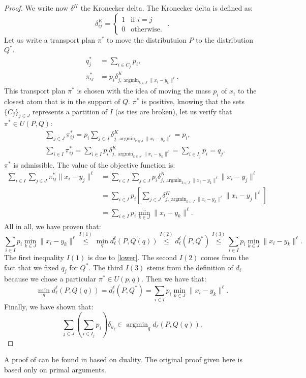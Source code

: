 \documentclass{amsart}
\newcommand{\argmin}{\mathop{\arg\min}}
\begin{document}
\begin{proof}
We write now $\delta^K$ the Kronecker delta. The Kronecker delta is defined as: $$\delta^K_{ij} = \begin{cases} 
      1 & \text{if } i=j \\
      0 & \text{otherwise. } 
   \end{cases}.$$
Let us write a transport plan $\pi^*$ to move the distributuion $P$ to the distribution $Q^*$.
\begin{align*}
    q_j^*&=\sum_{i\in C_j}p_i, \\
    \pi_{ij}^*&=p_i\delta^K_{j,\argmin_{k\in J}\lVert x_i-y_k\rVert^\ell}.
\end{align*}
\noindent This transport plan $\pi^*$ is chosen with the idea of moving the mass $p_i$ of $x_i$ to the closest atom that is in the support of $Q$. $\pi^*$ is positive, knowing that the sets $\{C_j\}_{j\in J}$ represents a partition of $I$ (as ties are broken), let us verify that $\pi^*\in U\left(P,Q\right)$:
\begin{align*}
    &\sum_{j\in J}\pi^*_{ij}=p_i\sum_{j\in J}\delta^K_{j,\argmin_{k\in J}\lVert x_i-y_k\rVert^\ell}=p_i, \\
    &\sum_{i\in I}\pi^*_{ij}=\sum_{i\in I}p_i\delta^K_{j,\argmin_{k\in J}\lVert x_i-y_k\rVert^\ell}=\sum_{i\in I_j}p_i=q_j.
\end{align*} $\pi^*$ is admissible. The value of the objective function is: 
\begin{align*}
    \sum_{i\in I}\sum_{j\in J}\pi^*_{ij}\lVert x_i-y_j\rVert^\ell &=\sum_{i\in I}\sum_{j\in J}p_i\delta^K_{j, \argmin_{k\in J}\lVert x_i-y_k\rVert^\ell}\lVert x_i-y_j\rVert^\ell \\ &=\sum_{i\in I}p_i\left[\sum_{j\in J}\delta^K_{j, \argmin_{k\in J}\lVert x_i-y_k\rVert^\ell}\lVert x_i-y_j\rVert^\ell\right] \\ &=\sum_{i\in I}p_i\min_{k\in J}\lVert x_i-y_k\rVert^\ell.
\end{align*}
All in all, we have proven that:
$$
\sum_{i\in I}p_i\min_{k\in J}\lVert x_i-y_k\rVert ^\ell\overset{I(1)}{\leq} \min_{q} d_\ell^\ell\left(P,Q\left(q\right)\right)\overset{I(2)}{\leq} d_\ell^\ell\left(P,Q^*\right) \overset{I(3)}{\leq} \sum_{i\in I}p_i\min_{k\in J}\lVert x_i-y_k\rVert ^\ell.
$$
The first inequality $I(1)$ is due to \ref{lower}. The second $I(2)$ comes from the fact that we fixed $q_j$ for $Q^*$. The third $I(3)$ stems from the definition of $d_\ell$ because we chose a particular $\pi^*\in U\left(p,q\right)$. Then we have that:
$$
\min_{q} d_\ell^\ell\left(P,Q\left(q\right)\right)= d_\ell^\ell\left(P,Q^*\right)= \sum_{i\in I}p_i\min_{k\in J}\lVert x_i-y_k\rVert ^\ell.
$$
Finally, we have shown that:
$$\sum_{j\in J}\left(\sum_{i\in I_j}p_i\right)\delta_{y_j}\in \argmin_q d_\ell\left(P,Q\left(q\right)\right).$$
\end{proof}
\begin{remark}
    A proof of  can be found in \cite{dupacova_scenario_2003} based on duality. The original proof given here is based only on primal arguments.
\end{remark}
\end{document}
